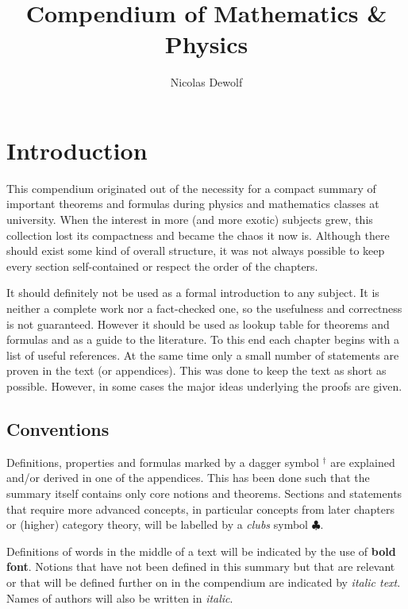 \documentclass[11pt, a4paper]{report}
\begin{document}
\reversemarginpar
\setcounter{tocdepth}{2}

\title{Compendium of Mathematics \& Physics}
\author{Nicolas Dewolf}
\maketitle

\tableofcontents

\chapter{Introduction}

    This compendium originated out of the necessity for a compact summary of important theorems and formulas during physics and mathematics classes at university. When the interest in more (and more exotic) subjects grew, this collection lost its compactness and became the chaos it now is. Although there should exist some kind of overall structure, it was not always possible to keep every section self-contained or respect the order of the chapters.

    It should definitely not be used as a formal introduction to any subject. It is neither a complete work nor a fact-checked one, so the usefulness and correctness is not guaranteed. However it should be used as lookup table for theorems and formulas and as a guide to the literature. To this end each chapter begins with a list of useful references. At the same time only a small number of statements are proven in the text (or appendices). This was done to keep the text as short as possible. However, in some cases the major ideas underlying the proofs are given.

\section{Conventions}

    Definitions, properties and formulas marked by a dagger symbol $^\dag$ are explained and/or derived in one of the appendices. This has been done such that the summary itself contains only core notions and theorems. Sections and statements that require more advanced concepts, in particular concepts from later chapters or (higher) category theory, will be labelled by a \textit{clubs} symbol $\clubsuit$.

    Definitions of words in the middle of a text will be indicated by the use of \textbf{bold font}. Notions that have not been defined in this summary but that are relevant or that will be defined further on in the compendium are indicated by \textit{italic text}. Names of authors will also be written in \textit{italic}.
\end{document}

